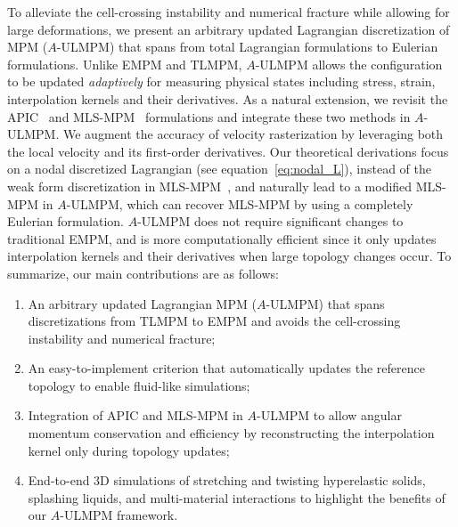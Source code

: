 To alleviate the cell-crossing instability and numerical fracture while allowing for large deformations, we present an arbitrary updated Lagrangian discretization of MPM ($A$-ULMPM) that spans from total Lagrangian formulations to Eulerian formulations. Unlike EMPM and TLMPM, $A$-ULMPM allows the configuration to be updated \emph{adaptively} for measuring physical states including stress, strain, interpolation kernels and their derivatives. 
As a natural extension, we revisit the APIC~\cite{Jiang:2017:APIC} and MLS-MPM~\cite{Hu:2018:Moving} formulations and integrate these two methods in $A$-ULMPM. We augment the accuracy of velocity rasterization by leveraging both the local velocity and its first-order derivatives. 
Our theoretical derivations focus on a nodal discretized Lagrangian (see equation~\eqref{eq:nodal_L}), instead of the weak form discretization in MLS-MPM~\cite{Hu:2018:Moving}, and naturally lead to a modified MLS-MPM in $A$-ULMPM, which can recover MLS-MPM by using a completely Eulerian formulation.  
$A$-ULMPM does not require significant changes to traditional EMPM, and is more computationally efficient since it only updates interpolation kernels and their derivatives when large topology changes occur. To summarize, our main contributions are as follows:
\vspace{-3mm}
\begin{enumerate}
    \item An arbitrary updated Lagrangian MPM ($A$-ULMPM) that spans discretizations from TLMPM to EMPM and avoids the cell-crossing instability and numerical fracture;
    \item An easy-to-implement criterion that automatically updates the reference topology to enable fluid-like simulations;
    \item Integration of APIC and MLS-MPM in $A$-ULMPM to allow angular momentum conservation and efficiency by reconstructing the interpolation kernel only during topology updates;
    \item End-to-end 3D simulations of stretching and twisting hyperelastic solids, splashing liquids, and multi-material interactions to highlight the benefits of our $A$-ULMPM framework.
\end{enumerate}